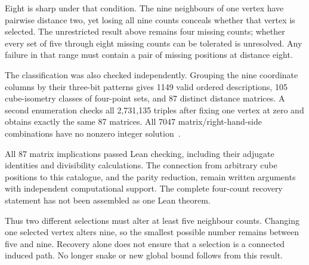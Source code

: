Eight is sharp under that condition. The nine neighbours of one vertex
have pairwise distance two, yet losing all nine counts conceals whether
that vertex is selected. The unrestricted result above remains four
missing counts; whether every set of five through eight missing counts
can be tolerated is unresolved. Any failure in that range must contain
a pair of missing positions at distance eight.

The classification was also checked independently. Grouping the nine
coordinate columns by their three-bit patterns gives 1149 valid
ordered descriptions, 105 cube-isometry classes of four-point sets,
and 87 distinct distance matrices. A second enumeration checks all
2,731,135 triples after fixing one vertex at zero and obtains exactly
the same 87 matrices. All 7047 matrix/right-hand-side combinations have
no nonzero integer solution~\cite{research239}.

All 87 matrix implications passed Lean checking, including their
adjugate identities and divisibility calculations. The connection from
arbitrary cube positions to this catalogue, and the parity reduction,
remain written arguments with independent computational support. The
complete four-count recovery statement has not been assembled as one
Lean theorem.

Thus two different selections must alter at least five neighbour
counts. Changing one selected vertex alters nine, so the smallest
possible number remains between five and nine. Recovery alone does
not ensure that a selection is a connected induced path. No longer
snake or new global bound follows from this result.
